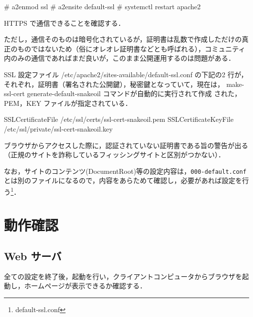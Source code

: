 \begin{cli}
# a2enmod ssl
# a2ensite default-ssl
# systemctl restart apache2
\end{cli}

HTTPS で通信できることを確認する．

ただし，通信そのものは暗号化されているが，証明書は乱数で作成しただけの真
正のものではないため（俗にオレオレ証明書などとも呼ばれる），コミュニティ
内のみの通信であればまだ良いが，このまま公開運用するのは問題がある．

SSL 設定ファイル /etc/apache2/sites-available/default-ssl.conf の下記の2 
行が，それぞれ，証明書（署名された公開鍵），秘密鍵となっていて，現在は，
make-ssl-cert generate-default-snakeoil コマンドが自動的に実行されて作成
された，PEM，KEY ファイルが指定されている．

\begin{cli}
 SSLCertificateFile /etc/ssl/certs/ssl-cert-snakeoil.pem
 SSLCertificateKeyFile /etc/ssl/private/ssl-cert-snakeoil.key
\end{cli}

ブラウザからアクセスした際に，認証されていない証明書である旨の警告が出る
（正規のサイトを詐称しているフィッシングサイトと区別がつかない）．

なお，サイトのコンテンツ(DocumentRoot)等の設定内容は，\texttt{000-default.conf}とは別のファイルになるので，内容をあらためて確認し，必要があれば設定を行う\footnote{default-ssl.conf}．


\section{動作確認}

\subsection*{Web サーバ}

全ての設定を終了後，起動を行い，クライアントコンピュータからブラウザを起
動し，ホームページが表示できるか確認する．

